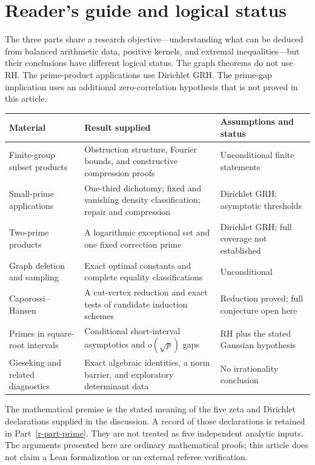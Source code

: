 \documentclass[11pt,a4paper]{article}
\theoremstyle{definition}
\theoremstyle{remark}
\begin{document}
\section*{Reader's guide and logical status}
The three parts share a research objective---understanding what can be
deduced from balanced arithmetic data, positive kernels, and extremal
inequalities---but their conclusions have different logical status.
The graph theorems do not use RH. The prime-product applications use
Dirichlet GRH. The prime-gap implication uses an additional zero-correlation
hypothesis that is not proved in this article.

\begin{center}\small
\begin{tabularx}{\textwidth}{@{}>{\raggedright\arraybackslash}p{}>{\raggedright\arraybackslash}X>{\raggedright\arraybackslash}p{}@{}}
\toprule
Material & Result supplied & Assumptions and status\\
\midrule
Finite-group subset products & Obstruction structure, Fourier bounds,
and constructive compression proofs & Unconditional finite statements\\[4pt]
Small-prime applications & One-third dichotomy; fixed and vanishing
density classification; repair and compression & Dirichlet GRH;
asymptotic thresholds\\[4pt]
Two-prime products & A logarithmic exceptional set and one fixed
correction prime & Dirichlet GRH; full coverage not established\\[4pt]
Graph deletion and sampling & Exact optimal constants and complete
equality classifications & Unconditional\\[4pt]
Caporossi--Hansen & A cut-vertex reduction and exact tests of candidate
induction schemes & Reduction proved; full conjecture open here\\[4pt]
Primes in square-root intervals & Conditional short-interval asymptotics
and $o(\sqrt p)$ gaps & RH plus the stated Gaussian hypothesis\\[4pt]
Gieseking and related diagnostics & Exact algebraic identities, a norm
barrier, and exploratory determinant data & No irrationality conclusion\\
\bottomrule
\end{tabularx}
\end{center}

The mathematical premise is the stated meaning of the five zeta and
Dirichlet declarations supplied in the discussion. A record of those
declarations is retained in Part~\ref{r-part-prime}. They are not treated
as five independent analytic inputs. The arguments presented here are
ordinary mathematical proofs; this article does not claim a Lean
formalization or an external referee verification.
\end{document}
